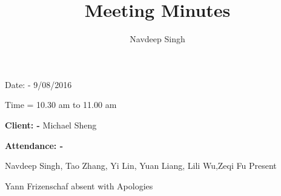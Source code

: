 \documentclass[11pt]{article}
\begin{document}
\title {Meeting Minutes}

\author{Navdeep Singh}

\maketitle



\begin{flushleft}

Date: - 9/08/2016  

\end{flushleft}

\begin{flushleft}

  Time = 10.30 am to 11.00 am 

\end{flushleft}





\begin{flushleft}

\textbf{Client: -} Michael Sheng 

 \end{flushleft}

\begin{flushleft}

\textbf{Attendance: -}

 Navdeep Singh, Tao Zhang, Yi Lin, Yuan Liang, Lili Wu,Zeqi Fu Present 

 \end{flushleft}

 

 \begin{flushleft}

Yann Frizenschaf absent with Apologies

\end{flushleft}

                          
\end{document}

